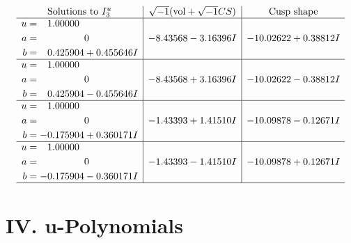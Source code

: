 \documentclass[1p]{elsarticle_modified}
\theoremstyle{definition}
\newcommand{\I}{\sqrt{-1}}
\begin{document}
$$\begin{array}{c|c|c}  
\text{Solutions to }I^u_{3}& \I (\text{vol} + \sqrt{-1}CS) & \text{Cusp shape}\\
 \hline 
\begin{aligned}
u &= \phantom{-}1.00000\phantom{ +0.000000I} \\
a &= \phantom{-0.000000 } 0 \\
b &= \phantom{-}0.425904 + 0.455646 I\end{aligned}
 & -8.43568 - 3.16396 I & -10.02622 + 0.38812 I \\ \hline\begin{aligned}
u &= \phantom{-}1.00000\phantom{ +0.000000I} \\
a &= \phantom{-0.000000 } 0 \\
b &= \phantom{-}0.425904 - 0.455646 I\end{aligned}
 & -8.43568 + 3.16396 I & -10.02622 - 0.38812 I \\ \hline\begin{aligned}
u &= \phantom{-}1.00000\phantom{ +0.000000I} \\
a &= \phantom{-0.000000 } 0 \\
b &= -0.175904 + 0.360171 I\end{aligned}
 & -1.43393 + 1.41510 I & -10.09878 - 0.12671 I \\ \hline\begin{aligned}
u &= \phantom{-}1.00000\phantom{ +0.000000I} \\
a &= \phantom{-0.000000 } 0 \\
b &= -0.175904 - 0.360171 I\end{aligned}
 & -1.43393 - 1.41510 I & -10.09878 + 0.12671 I\\
 \hline 
 \end{array}$$\newpage
\newpage\renewcommand{\arraystretch}{1}
\centering \section*{ IV. u-Polynomials}
\end{document}
